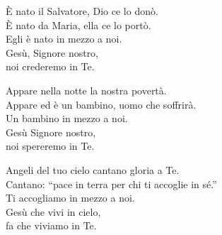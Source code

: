 
\strofa È nato il Salvatore, Dio ce lo donò.\\
È nato da Maria, ella ce lo portò.\\
Egli è nato in mezzo a noi.\\
Gesù, Signore nostro,\\
noi crederemo in Te.

\spazio

\strofa Appare nella notte la nostra povertà.\\
Appare ed è un bambino, uomo che soffrirà.\\
Un bambino in mezzo a noi.\\
Gesù Signore nostro,\\
noi spereremo in Te.

\spazio

\strofa Angeli del tuo cielo cantano gloria a Te.\\
Cantano: ``pace in terra per chi ti accoglie in sé.''\\
Ti accogliamo in mezzo a noi.\\
Gesù che vivi in cielo,\\
fa che viviamo in Te.